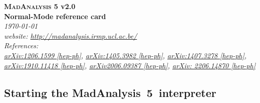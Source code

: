 \documentclass[a4paper]{article}
\newcommand{\MAnorm}{{MadAnalysis}~5}
\begin{document}
\begin{center} 
{\color{ao} \huge \textbf{\textsc{MadAnalysis} 5 v2.0}} \\ \vspace{0.25cm}
{\color{ao} \huge \textbf{Normal-Mode reference card}} \\ \vspace{0.25cm}
\vspace{0.1cm} \textsl{\today}\\
\vspace{0.1cm} \textsl{website: \url{http://madanalysis.irmp.ucl.ac.be/}}\\
\vspace{0.1cm} \textsl{References:\\ \href{https://arxiv.org/abs/1206.1599}{arXiv:1206.1599 [hep-ph]}, \href{https://arxiv.org/abs/1405.3982}{arXiv:1405.3982 [hep-ph]}, 
\href{https://arxiv.org/abs/1407.3278}{arXiv:1407.3278 [hep-ph]},\\
\href{https://arxiv.org/abs/1910.11418}{arXiv:1910.11418 [hep-ph]},
\href{https://arxiv.org/abs/2006.09387}{arXiv2006.09387 [hep-ph]}, 
\href{https://arxiv.org/abs/2206.14870}{arXiv: 2206.14870 [hep-ph]}
}
\end{center}

\hspace{0.5cm}

\begin{shaded}
\section{\Large Starting the \MAnorm\ interpreter}
\end{shaded}
\end{document}
